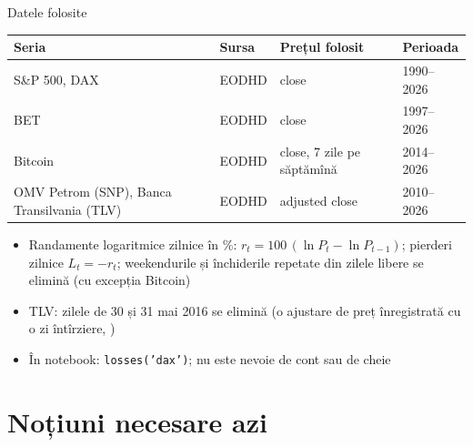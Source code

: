 \begin{frame}{Datele folosite}
\itemsize{\small}
\begin{center}
\footnotesize
\begin{tabular}{llll}
\toprule
\textbf{Seria} & \textbf{Sursa} & \textbf{Prețul folosit} & \textbf{Perioada} \\
\midrule
S\&P 500, DAX & EODHD & close & 1990--2026 \\
BET & EODHD & close & 1997--2026 \\
Bitcoin & EODHD & close, 7 zile pe săptămînă & 2014--2026 \\
OMV Petrom (SNP), Banca Transilvania (TLV) & EODHD & adjusted close & 2010--2026 \\
\bottomrule
\end{tabular}
\end{center}
\begin{itemize}
    \item Randamente logaritmice zilnice în \%: $r_t = 100\,(\ln P_t - \ln P_{t-1})$; pierderi zilnice $L_t = -r_t$; weekendurile și închiderile repetate din zilele libere se elimină (cu excepția Bitcoin)
    \item TLV: zilele de 30 și 31 mai 2016 se elimină (o ajustare de preț înregistrată cu o zi întîrziere, )
    \item În notebook: \texttt{losses('dax')}; nu este nevoie de cont sau de cheie
\end{itemize}
\end{frame}


\section{Noțiuni necesare azi}

